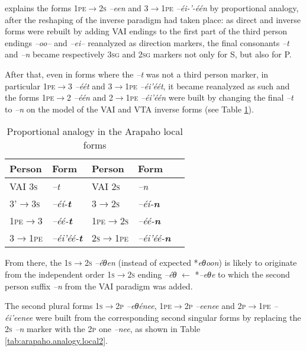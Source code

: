\documentclass[twoside,a4paper,11pt]{article}
\newcommand{\ipa}[1]{{\phon\textit{#1}}}
\newcommand{\grise}[1]{\cellcolor{lightgray}\textbf{#1}}
\newcommand{\Σ}{\greek{Σ}}
\begin{document}
\citet[23]{goddard65arapaho} explains the forms \textsc{1pe$\rightarrow$2s} \ipa{--een} and \textsc{3$\rightarrow$1pe} \ipa{--éi-'-één} by proportional analogy, after the reshaping of the inverse paradigm had taken place: as direct and inverse forms were rebuilt by adding VAI endings to the first part of the third person endings \ipa{--oo--} and \ipa{--ei--} reanalyzed as direction markers, the final consonants \ipa{--t} and \ipa{--n} became   respectively \textsc{3sg} and \textsc{2sg} markers not only for  S, but also for P.

After that, even in forms where the \ipa{--t} was not a third person marker, in particular  \textsc{1pe$\rightarrow$3}   \ipa{--éét} and   \textsc{3$\rightarrow$1pe}   \ipa{--éi'éét}, it became reanalyzed as such and the forms  \textsc{1pe$\rightarrow$2}   \ipa{--één} and   \textsc{2$\rightarrow$1pe}   \ipa{--éi'één} were built by changing the final \ipa{--t} to \ipa{--n} on the model of the VAI and VTA inverse forms (see Table  \ref{tab:arapaho.analogy.local}).

\begin{table}[H]
\caption{Proportional analogy in the Arapaho local forms}
\centering \label{tab:arapaho.analogy.local}
\begin{tabular}{lllll}
\toprule
 Person &  Form &  Person &  Form\\
\midrule 
 VAI \textsc{3s} & \ipa{--t} &  VAI \textsc{2s} & \ipa{--n} \\
  \textsc{3'$\rightarrow$3s} & \ipa{--éí-\textbf{t}} &   \textsc{3$\rightarrow$2s} & \ipa{--éí-\textbf{n}} \\
  \midrule 
    \textsc{1pe$\rightarrow$3} & \ipa{--éé-\textbf{t}} &  \textsc{1pe$\rightarrow$2s} &  \grise{}\ipa{--éé-\textbf{n}} \\
  \textsc{3$\rightarrow$1pe} & \ipa{--éi'éé-\textbf{t}} &  \textsc{2s$\rightarrow$1pe} &  \grise{}\ipa{--éi'éé-\textbf{n}} \\
\bottomrule
\end{tabular}
\end{table}

From there, the \textsc{1s$\rightarrow$2s}  \ipa{--éθen} (instead of expected *\ipa{eθoon}) is likely to originate from the independent order \textsc{1s$\rightarrow$2s} ending \ipa{--éθ} $\leftarrow$ *\ipa{--eθe} to which the second person suffix \ipa{--n} from the VAI paradigm was added. 

The second plural forms \textsc{1s$\rightarrow$2p} \ipa{--eθénee}, \textsc{1pe$\rightarrow$2p} \ipa{--eenee}  and \textsc{2p$\rightarrow$1pe} \ipa{--éi'eenee} were built from the corresponding second singular forms by replacing the \textsc{2s}  \ipa{--n} marker with the \textsc{2p} one \ipa{--nee}, as shown in Table \ref{tab:arapaho.analogy.local2}.
 
\end{document}
